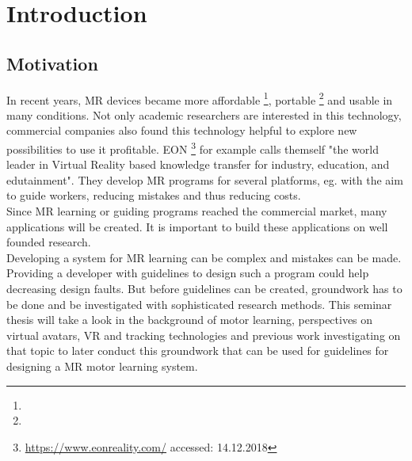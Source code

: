 \chapter{Introduction}

\section{Motivation}
In recent years, MR devices became more affordable \footnote{\todo}, portable \footnote{\todo} and usable in many conditions. Not only academic researchers are interested in this technology, commercial companies also found this technology helpful to explore new possibilities to use it profitable. EON \footnote{\hyperlink{https://www.eonreality.com/}{https://www.eonreality.com/} accessed: 14.12.2018} for example calls themself "the world leader in Virtual Reality based knowledge transfer for industry, education, and edutainment". They develop MR programs for several platforms, eg. with the aim to guide workers, reducing mistakes and thus reducing costs.\\
Since MR learning or guiding programs reached the commercial market, many applications will be created. It is important to build these applications on well founded research.\\
Developing a system for MR learning can be complex and mistakes can be made. Providing a developer with guidelines to design such a program could help decreasing design faults. But before guidelines can be created, groundwork has to be done and be investigated with sophisticated research methods.
This seminar thesis will take a look in the background of motor learning, perspectives on virtual avatars, VR and tracking technologies and previous work investigating on that topic to later conduct this groundwork that can be used for guidelines for designing a MR motor learning system.

